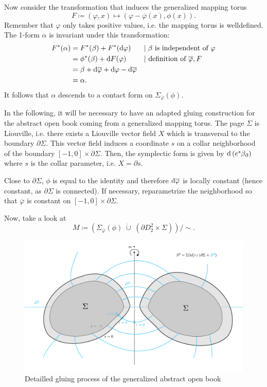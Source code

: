 Now consider the transformation that induces the generalized mapping torus
\[
    F \coloneqq (\varphi, x) \mapsto (\varphi - \overline{\varphi}(x), \phi(x)).    
\]
Remember that $\varphi$ only takes positive values, i.e. the mapping torus is welldefined.
The 1-form $\alpha$ is invariant under this transformation:
\begin{align*}
    F^*(\alpha) &= F^*(\beta) + F^*(\mathrm{d} \varphi)&&|\;\beta\text{ is independent of }\varphi\\
    &= \phi^*(\beta) + \mathrm{d} F(\varphi)&&|\text{ definition of }\overline{\varphi}, F\\
    &= \beta + \mathrm{d}\overline{\varphi} + \mathrm{d} \varphi - \mathrm{d} \overline{\varphi}\\
    &= \alpha.
\end{align*}
It follows that $\alpha$ descends to a contact form on $\Sigma_{\overline{\varphi}}(\phi)$. 

In the following, it will be necessary to have an adapted gluing construction for the abstract open book coming from a generalized mapping torus.
The page $\Sigma$ is Liouville, i.e. there exists a Liouville vector field $X$ which is transversal to the boundary $\partial \Sigma$.
This vector field induces a coordinate $s$ on a collar neighborhood of the boundary $[-1,0] \times \partial \Sigma$.
Then, the symplectic form is given by $\mathrm{d} \left(e^s\beta_\partial\right)$ where $s$ is the collar parameter, i.e. $X = \partial s$.

Close to $\partial \Sigma$, $\phi$ is equal to the identity and therefore $\mathrm{d} \overline{\varphi}$ is locally constant (hence constant, as $\partial \Sigma$ is connected).
If necessary, reparametrize the neighborhood so that $\overline{\varphi}$ is constant on $[-1,0]\times \partial \Sigma$.

Now, take a look at
\[
    M \coloneqq \left(\Sigma_{\overline{\varphi}}(\phi)\; \dot\cup\; \left(\partial D_2^2 \times \Sigma\right)\right)/\sim.
\]
\begin{figure}
    \includegraphics[width=\textwidth]{images/abstract_open_book_gluing.pdf}
    \caption[Gluing an abstract open book]{Detailled gluing process of the generalized abstract open book}
    \label{fig:abstract_open_book_gluing}
\end{figure}

